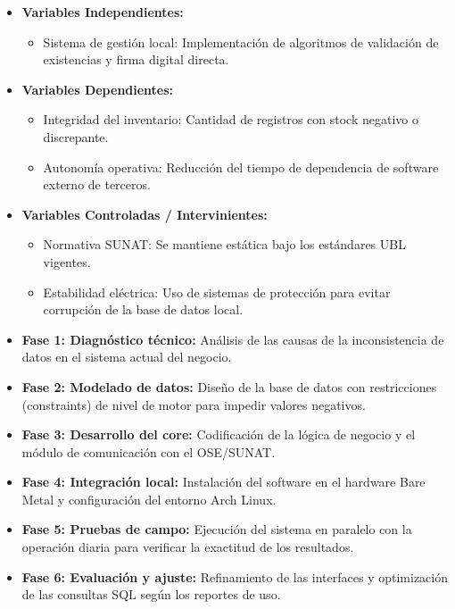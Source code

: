 \begin{itemize}
    \item \textbf{Variables Independientes:}
        \begin{itemize}
            \item Sistema de gestión local: Implementación de algoritmos de validación de existencias y firma digital directa.
        \end{itemize}
    \item \textbf{Variables Dependientes:}
        \begin{itemize}
            \item Integridad del inventario: Cantidad de registros con stock negativo o discrepante.
            \item Autonomía operativa: Reducción del tiempo de dependencia de software externo de terceros.
        \end{itemize}
    \item \textbf{Variables Controladas / Intervinientes:}
        \begin{itemize}
            \item Normativa SUNAT: Se mantiene estática bajo los estándares UBL vigentes.
            \item Estabilidad eléctrica: Uso de sistemas de protección para evitar corrupción de la base de datos local.
        \end{itemize}
\end{itemize}



\begin{itemize}
    \item \textbf{Fase 1: Diagnóstico técnico:} Análisis de las causas de la inconsistencia de datos en el sistema actual del negocio.
    \item \textbf{Fase 2: Modelado de datos:} Diseño de la base de datos con restricciones (constraints) de nivel de motor para impedir valores negativos.
    \item \textbf{Fase 3: Desarrollo del core:} Codificación de la lógica de negocio y el módulo de comunicación con el OSE/SUNAT.
    \item \textbf{Fase 4: Integración local:} Instalación del software en el hardware Bare Metal y configuración del entorno Arch Linux.
    \item \textbf{Fase 5: Pruebas de campo:} Ejecución del sistema en paralelo con la operación diaria para verificar la exactitud de los resultados.
    \item \textbf{Fase 6: Evaluación y ajuste:} Refinamiento de las interfaces y optimización de las consultas SQL según los reportes de uso.
\end{itemize}

